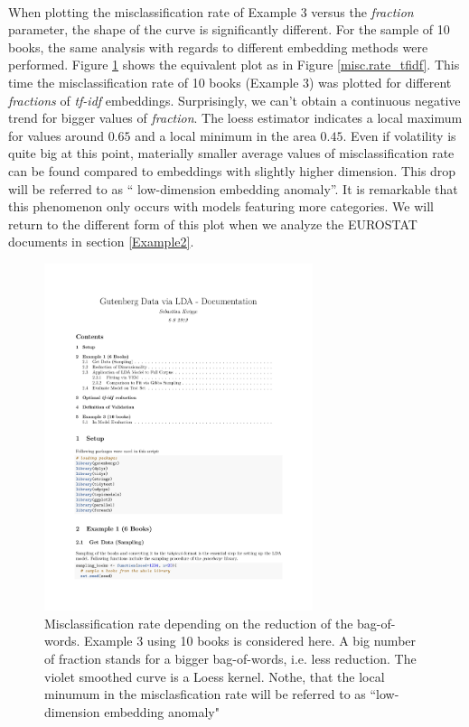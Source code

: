 \documentclass[11pt,a4paper]{article}
\begin{document}
\ \\
When plotting the misclassification rate of Example 3 versus the \textit{fraction} parameter, the shape of the curve is significantly different. For the sample of 10 books, the same analysis with regards to different embedding methods were performed. Figure \ref{misc.rate_10_tfidf} shows the equivalent plot as in Figure \ref{misc.rate_tfidf}. This time the misclassification rate of 10 books (Example 3) was plotted for different \textit{fractions} of \textit{tf-idf} embeddings. Surprisingly, we can’t obtain a continuous negative trend for bigger values of \textit{fraction}. The loess estimator indicates a local maximum for values around $0.65$ and a local minimum in the area $0.45$. Even if volatility is quite big at this point, materially smaller average values of misclassification rate can be found compared to embeddings with slightly higher dimension. This drop will be referred to as `` low-dimension embedding anomaly”. It is remarkable that this phenomenon only occurs with models featuring more categories. We will return to the different form of this plot when we analyze the EUROSTAT documents in section \ref{Example2}. 
\begin{figure}[h]
	\centering
	\includegraphics[page=23, trim=85 275 50
	195,clip,width=0.7\textwidth]{LDA_Documentation.pdf}
	\caption{Misclassification rate depending on the reduction of the bag-of-words. Example 3 using 10 books is considered here. A big number of fraction stands for a bigger bag-of-words, i.e. less reduction. The violet smoothed curve is a Loess kernel. Nothe, that the local minumum in the misclasfication rate will be referred to as ``low-dimension embedding anomaly"}
	\label{misc.rate_10_tfidf}
\end{figure}
\end{document}
